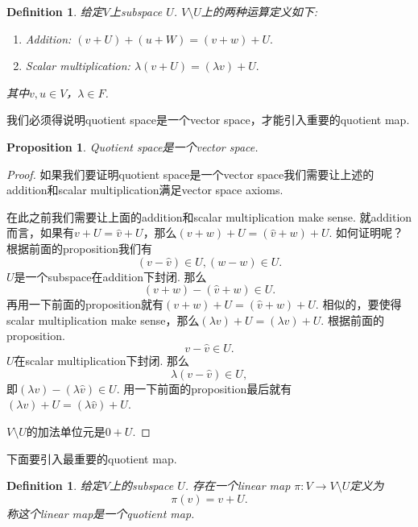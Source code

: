 \documentclass{article}
\newtheorem{proposition}[theorem]{Proposition}
\newtheorem{definition}[theorem]{Definition}
\newcommand*{\xfunc}[4]{{#2}\colon{#3}{#1}{#4}}
\newcommand*{\func}[3]{\xfunc{\to}{#1}{#2}{#3}}
\begin{document}
\begin{definition}
\rm 给定$V$上subspace $U$. $V \setminus U$上的两种运算定义如下:
\begin{enumerate}
	\item Addition: $(v+U) + (u +W) = (v+w) + U.$
	\item Scalar multiplication: $\lambda(v+U)=(\lambda v)+U.$ 
\end{enumerate}
其中$v,u \in V$，$\lambda \in F$.
\end{definition}


{\color{blue} 我们必须得说明quotient space是一个vector space，才能引入重要的quotient map}.
\begin{proposition}
\rm Quotient space是一个vector space.
\end{proposition}

\begin{proof}

如果我们要证明quotient space是一个vector space我们需要让上述的addition和scalar multiplication满足vector space axioms.

在此之前我们需要让上面的addition和scalar multiplication make sense. 就addition而言，如果有$v+U = \widehat{v} + U$，那么$(v+w)+U = (\widehat{v}+w)+U$. 如何证明呢？根据前面的proposition我们有
$$
(v-\widehat{v}) \in U , (w-w) \in U.
$$
$U$是一个subspace在addition下封闭. 那么
$$
(v+w)-(\widehat{v}+w) \in U.
$$
再用一下前面的proposition就有$(v+w)+U = (\widehat{v}+w)+U$. 相似的，要使得scalar multiplication make sense，那么$(\lambda v) + U = (\lambda \widehat{v}) + U$. 根据前面的proposition.
$$
v-\widehat{v} \in U.
$$ 
$U$在scalar multiplication下封闭. 那么
$$
\lambda(v-\widehat{v}) \in U,
$$
即$(\lambda v) - (\lambda \widehat{v}) \in U$. 用一下前面的proposition最后就有$(\lambda v) + U = (\lambda \widehat{v}) + U$.

$V\setminus U$的加法单位元是$0 + U$. 
\end{proof}

{\color{red} 下面要引入最重要的quotient map}.

\begin{definition}
\rm 给定$V$上的subspace $U$. 存在一个linear map $\func{\pi}{V}{V\setminus U}$定义为
$$
\pi(v) = v+U.
$$
称这个linear map是一个quotient map.
\end{definition}
\end{document}
